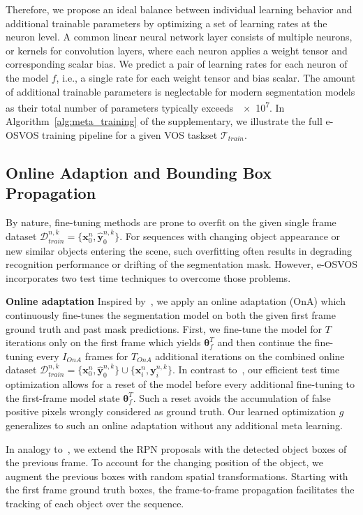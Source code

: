\documentclass{article}
\begin{document}
        Therefore, we propose an ideal balance between individual learning behavior and additional trainable parameters by optimizing a set of learning rates at the neuron level.
A common linear neural network layer consists of multiple neurons, or kernels for convolution layers, where each neuron applies a weight tensor and corresponding scalar bias.
We predict a pair of learning rates for each neuron of the model $f$, i.e., a single rate for each weight tensor and bias scalar.
The amount of additional trainable parameters is neglectable for modern segmentation models as their total number of parameters typically exceeds~\num{e7}.
In Algorithm~\ref*{alg:meta_training} of the supplementary, we illustrate the full e-OSVOS training pipeline for a given VOS taskset $\mathcal{T}_{train}$.

\subsection{Online Adaption and Bounding Box Propagation} \label{sec:online_adaptation}
    By nature, fine-tuning methods are prone to overfit on the given single frame dataset $\mathcal{D}_{train}^{n, k} = \{\mathbf{x}_0^n, \mathbf{\hat{y}}_0^{n, k} \}$.
For sequences with changing object appearance or new similar objects entering the scene, such overfitting often results in degrading recognition performance or drifting of the segmentation mask.
However, e-OSVOS incorporates two test time techniques to overcome those problems.

  {\bf Online adaptation}
Inspired by~\cite{onavos}, we apply an online adaptation (OnA) which continuously fine-tunes the segmentation model on both the given first frame ground truth and past mask predictions.
First, we fine-tune the model for $T$ iterations only on the first frame which yields $\boldsymbol \theta_f^T$ and then continue the fine-tuning every $I_{OnA}$ frames for $T_{OnA}$ additional iterations on the combined online dataset $\mathcal{D}_{train}^{n, k} = \{\mathbf{x}_0^n, \mathbf{\hat{y}}_0^{n, k} \} \cup \{\mathbf{x}_{i}^n, \mathbf{y}_{i}^{n, k} \}$.
In contrast to~\cite{onavos}, our efficient test time optimization allows for a reset of the model before every additional fine-tuning to the first-frame model state $\boldsymbol \theta_f^T$.
Such a reset avoids the accumulation of false positive pixels wrongly considered as ground truth.
Our learned optimization $g$ generalizes to such an online adaptation without any additional meta learning.


In analogy to~\cite{tracktor_2019_ICCV}, we extend the RPN proposals with the detected object boxes of the previous frame.
To account for the changing position of the object, we augment the previous boxes with random spatial transformations.
Starting with the first frame ground truth boxes, the frame-to-frame propagation facilitates the tracking of each object over the sequence.
\end{document}
